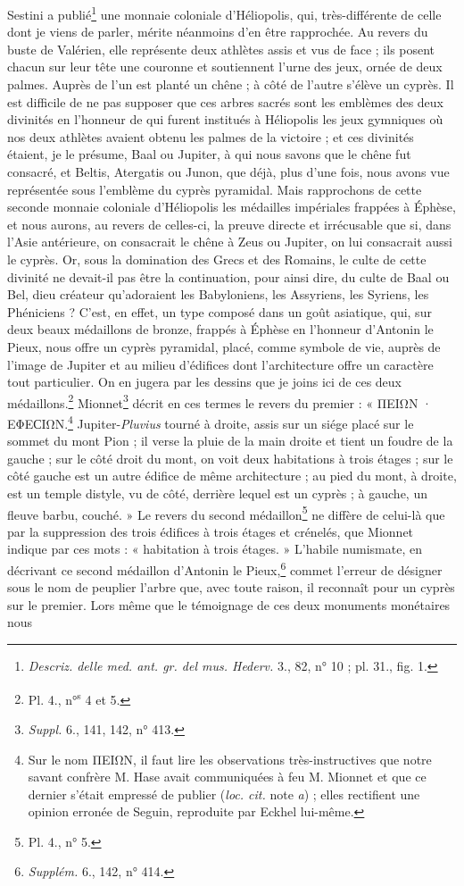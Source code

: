 \documentclass{article}
\begin{document}
Sestini a publié\footnote{\emph{Descriz. delle med. ant. gr. del mus. Hederv.} 3., 82, n° 10 ; pl. 31., fig. 1.} une monnaie coloniale d'Héliopolis, qui, très-différente de celle dont je viens de parler, mérite néanmoins d'en être rapprochée. Au revers du buste de Valérien, elle représente deux athlètes assis et vus de face ; ils posent chacun sur leur tête une couronne et soutiennent l'urne des jeux, ornée de deux palmes. Auprès de l'un est planté un chêne ; à côté de l'autre s'élève un cyprès. Il est difficile de ne pas supposer que ces arbres sacrés sont les emblèmes des deux divinités en l'honneur de qui furent institués à Héliopolis les jeux gymniques où nos deux athlètes avaient obtenu les palmes de la victoire ; et ces divinités étaient, je le présume, Baal ou Jupiter, à qui nous savons que le chêne fut consacré, et Beltis, Atergatis ou Junon, que déjà, plus d'une fois, nous avons vue représentée sous l'emblème du cyprès pyramidal. Mais rapprochons de cette seconde monnaie coloniale d'Héliopolis les médailles impériales frappées à Éphèse, et nous aurons, au revers de celles-ci, la preuve directe et irrécusable que si, dans l'Asie antérieure, on consacrait le chêne à Zeus ou Jupiter, on lui consacrait aussi le cyprès. Or, sous la domination des Grecs et des Romains, le culte de cette divinité ne devait-il pas être la continuation, pour ainsi dire, du culte de Baal ou Bel, dieu créateur qu'adoraient les Babyloniens, les Assyriens, les Syriens, les Phéniciens ? C'est, en effet, un type composé dans un goût asiatique, qui, sur deux beaux médaillons de bronze, frappés à Éphèse en l'honneur d'Antonin le Pieux, nous offre un cyprès pyramidal, placé, comme symbole de vie, auprès de l'image de Jupiter et au milieu d'édifices dont l'architecture offre un caractère tout particulier. On en jugera par les dessins que je joins ici de ces deux médaillons.\footnote{Pl. 4., n°\textsuperscript{s} 4 et 5.} Mionnet\footnote{\emph{Suppl.} 6., 141, 142, n° 413.} décrit en ces termes le revers du premier : « \textgreek{ΠΕΙΩΝ · ΕΦΕϹΙΩΝ}.\footnote{Sur le nom \textgreek{ΠΕΙΩΝ}, il faut lire les observations très-instructives que notre savant confrère M. Hase avait communiquées à feu M. Mionnet et que ce dernier s'était empressé de publier (\emph{loc. cit.} note \emph{a}) ; elles rectifient une opinion erronée de Seguin, reproduite par Eckhel lui-même.} Jupiter-\emph{Pluvius} tourné à droite, assis sur un siége placé sur le sommet du mont Pion ; il verse la pluie de la main droite et tient un foudre de la gauche ; sur le côté droit du mont, on voit deux habitations à trois étages ; sur le côté gauche est un autre édifice de même architecture ; au pied du mont, à droite, est un temple distyle, vu de côté, derrière lequel est un cyprès ; à gauche, un fleuve barbu, couché. » Le revers du second médaillon\footnote{Pl. 4., n° 5.} ne diffère de celui-là que par la suppression des trois édifices à trois étages et crénelés, que Mionnet indique par ces mots : « habitation à trois étages. » L'habile numismate, en décrivant ce second médaillon d'Antonin le Pieux,\footnote{\emph{Supplém.} 6., 142, n° 414.} commet l'erreur de désigner sous le nom de peuplier l'arbre que, avec toute raison, il reconnaît pour un cyprès sur le premier. Lors même que le témoignage de ces deux monuments monétaires nous 
\end{document}
